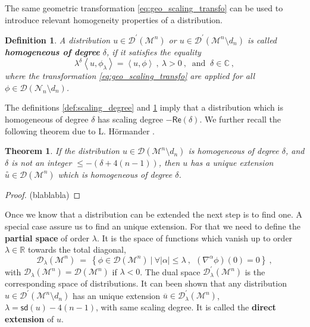 \documentclass[11pt]{book}
\newcommand{\sd}{\mathsf{sd}}
\renewcommand{\Re}{\mathsf{Re}}
\newcommand{\abs}[1]{\left|#1\right|}
\newcommand{\sm}[1]{\left\langle#1\right\rangle}
\newcommand{\exte}[1]{\overset{\circ}{#1}}
\newcommand{\Dcal}{\mathcal{D}}
\newcommand{\Mcal}{\mathcal{M}}
\newcommand{\Ncal}{\mathcal{N}}
\newcommand{\Cbb}{\mathbb{C}}
\newcommand{\Rbb}{\mathbb{R}}
\theoremstyle{break}
\newtheorem{theorem}{Theorem}[chapter]
\newtheorem{definition}{Definition}[chapter]
\begin{document}
The same geometric transformation \eqref{eq:geo_scaling_transfo} can be used to introduce relevant homogeneity properties of a distribution.

\begin{definition}\label{def:homogeneous}
A distribution $u \in \Dcal^\prime(\Mcal^n)$ or $u \in \Dcal^\prime(\Mcal^n\setminus d_n)$ is called {\bf homogeneous of degree} $\delta$, if it satisfies the equality
%
\begin{equation}
\lambda^{\delta} \sm{ u , \phi_\lambda } = \sm{ u , \phi } \ , \ \lambda > 0 \ , \ \mbox{ and } \ \delta \in \Cbb \ ,
\label{eq:homog_id}
\end{equation}
%
where the transformation \eqref{eq:geo_scaling_transfo} are applied for all $\phi \in \Dcal(\Ncal_n\setminus d_n)$.
\end{definition}


The definitions \ref{def:scaling_degree} and \ref{def:homogeneous} imply that a distribution which is homogeneous of degree $\delta$ has scaling degree $-\Re(\delta)$. We further recall the following theorem due to L. Hörmander \cite{hormander_analysis_1990}.


\begin{theorem}
If the distribution $u \in \Dcal(\Mcal^n\setminus d_n)$ is homogeneous of degree $\delta$, and
$\delta$ is not an integer $\leq -(\delta+4(n-1))$, then $u$ has a unique extension $\exte{u} \in \Dcal(\Mcal^n)$ which is homogeneous of degree $\delta$.
\end{theorem}


\begin{proof}
(blablabla)
\end{proof}


Once we know that a distribution can be extended the next step is to find one. A special case assure us to find an unique extension. For that we need to define the \textbf{partial space} of order $\lambda$. It is the space of functions which vanish up to order $\lambda \in \Rbb$ towards the total diagonal, 
%
\begin{equation*}
\Dcal_{\lambda}(\Mcal^n) \ = \ \left\{ \phi \in \Dcal(\Mcal^n) \ | \ \forall \abs{\alpha} \leq \lambda\ , \ \ \left(\nabla^{\alpha}\phi\right)(0)=0 \right\} \ ,
\end{equation*}
%
with $\Dcal_\lambda(\Mcal^n) = \Dcal(\Mcal^n)$ if $\lambda < 0$. The dual space $\Dcal^\prime_\lambda(\Mcal^n)$ is the corresponding space of distributions. It can been shown that any distribution $u \in \Dcal^\prime (\Mcal^n \setminus d_n )$ has an unique extension $\overline{u} \in \Dcal^\prime_\lambda(\Mcal^n)$, $\lambda = \sd(u) - 4(n-1)$, with same scaling degree. It is called the \textbf{direct extension} of $u$.
\end{document}
